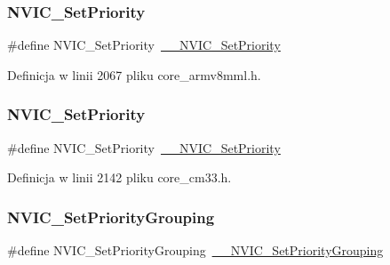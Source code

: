 \subsubsection{\texorpdfstring{N\+V\+I\+C\+\_\+\+Set\+Priority}{NVIC\_SetPriority}\hspace{0.1cm}{\footnotesize\ttfamily [11/12]}}
{\footnotesize\ttfamily \#define N\+V\+I\+C\+\_\+\+Set\+Priority~\hyperlink{group___c_m_s_i_s___core___n_v_i_c_functions_ga505338e23563a9c074910fb14e7d45fd}{\+\_\+\+\_\+\+N\+V\+I\+C\+\_\+\+Set\+Priority}}



Definicja w linii 2067 pliku core\+\_\+armv8mml.\+h.

\mbox{\label{group___c_m_s_i_s___core___n_v_i_c_functions_gae0e9d0e2f7b6133828c71b57d4941c35}} 
\subsubsection{\texorpdfstring{N\+V\+I\+C\+\_\+\+Set\+Priority}{NVIC\_SetPriority}\hspace{0.1cm}{\footnotesize\ttfamily [12/12]}}
{\footnotesize\ttfamily \#define N\+V\+I\+C\+\_\+\+Set\+Priority~\hyperlink{group___c_m_s_i_s___core___n_v_i_c_functions_ga505338e23563a9c074910fb14e7d45fd}{\+\_\+\+\_\+\+N\+V\+I\+C\+\_\+\+Set\+Priority}}



Definicja w linii 2142 pliku core\+\_\+cm33.\+h.

\mbox{\label{group___c_m_s_i_s___core___n_v_i_c_functions_ga0e798d5aec68cdd8263db86a76df788f}} 
\subsubsection{\texorpdfstring{N\+V\+I\+C\+\_\+\+Set\+Priority\+Grouping}{NVIC\_SetPriorityGrouping}\hspace{0.1cm}{\footnotesize\ttfamily [1/10]}}
{\footnotesize\ttfamily \#define N\+V\+I\+C\+\_\+\+Set\+Priority\+Grouping~\hyperlink{group___c_m_s_i_s___core___n_v_i_c_functions_gafc94dcbaee03e4746ade1f5bb9aaa56d}{\+\_\+\+\_\+\+N\+V\+I\+C\+\_\+\+Set\+Priority\+Grouping}}



